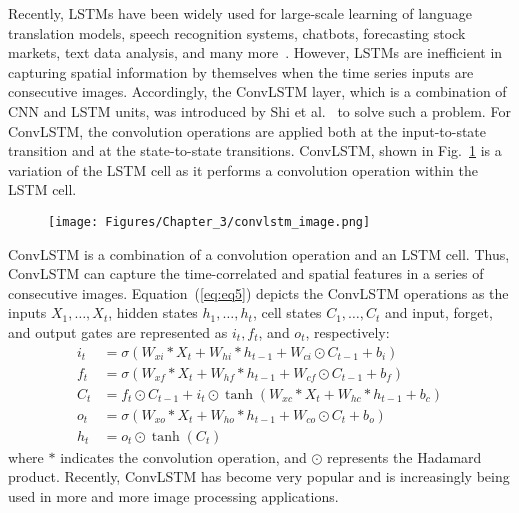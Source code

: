 Recently, LSTMs have been widely used for large-scale learning of language translation models, speech recognition systems, chatbots, forecasting stock markets, text data analysis, and many more~\cite{graves2014towards, cho2014properties}.
However, LSTMs are inefficient in capturing spatial information by themselves when the time series inputs are consecutive images.
Accordingly, the ConvLSTM layer, which is a combination of CNN and LSTM units, was introduced by Shi et al.~\cite{xingjian2015convolutional} to solve such a problem.
For ConvLSTM, the convolution operations are applied both at the input-to-state transition and at the state-to-state transitions.
ConvLSTM, shown in Fig.~\ref{fig:ConvLSTM} is a variation of the LSTM cell as it performs a convolution operation within the LSTM cell.
\begin{figure}[h!]
	\begin{center}
		\texttt{[image: Figures/Chapter\_3/convlstm\_image.png]}
	\end{center}
	\label{fig:ConvLSTM}
\end{figure}
ConvLSTM is a combination of a convolution operation and an LSTM cell.
Thus, ConvLSTM can capture the time-correlated and spatial features in a series of consecutive images. 
Equation~(\ref{eq:eq5}) depicts the ConvLSTM operations as the inputs \(X_1, \dots, X_t\), hidden states \(h_1, \dots, h_t\), cell states \(C_1, \dots, C_t\) and input, forget, and output gates are represented as \(i_t, f_t\), and \(o_t\), respectively:
\begin{equation}
	\begin{aligned}
		i_{t} &=\sigma\left(W_{x i} * X_{t}+W_{h i} * h_{t-1}+W_{c i} \odot C_{t-1}+b_{i}\right) 
		\\
		f_{t} &=\sigma\left(W_{x f} * X_{t}+W_{h f} * h_{t-1}+W_{c f} \odot C_{t-1}+b_{f}\right) \\
		C_{t} &=f_{t} \odot C_{t-1}+i_{t} \odot \tanh \left(W_{x c} * X_{t}+W_{h c} * h_{t-1}+b_{c}\right) 
		\\
		o_{t} &=\sigma\left(W_{x o} * X_{t}+W_{h o} * h_{t-1}+W_{c o} \odot C_{t}+b_{o}\right) \\
		h_{t} &=o_{t} \odot \tanh \left(C_{t}\right)
	\end{aligned}
	\label{eq:eq5}
\end{equation}
where \(*\) indicates the convolution operation, and \(\odot\) represents the Hadamard product.
Recently, ConvLSTM has become very popular and is increasingly being used in more and more image processing applications.